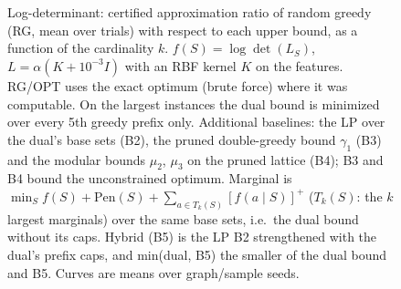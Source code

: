 \begin{figure}[t]
\centering
\setlength{\rgplotwidth}{0.245\textwidth}
\\[1pt]
\hfill
\hfill
\hfill
\\

\caption{Log-determinant: certified approximation ratio of random greedy (RG, mean over trials) with respect to each upper bound, as a function of the cardinality $k$. $f(S)=\log\det(L_S)$, $L=\alpha(K+10^{-3}I)$ with an RBF kernel $K$ on the features. RG/OPT uses the exact optimum (brute force) where it was computable. On the largest instances the dual bound is minimized over every 5th greedy prefix only. Additional baselines: the LP over the dual's base sets (B2), the pruned double-greedy bound $\gamma_1$ (B3) and the modular bounds $\mu_2$, $\mu_3$ on the pruned lattice (B4); B3 and B4 bound the unconstrained optimum. Marginal is $\min_S f(S)+\mathrm{Pen}(S)+\sum_{a\in T_k(S)}[f(a\mid S)]^+$ ($T_k(S)$: the $k$ largest marginals) over the same base sets, i.e.\ the dual bound without its caps. Hybrid (B5) is the LP B2 strengthened with the dual's prefix caps, and min(dual, B5) the smaller of the dual bound and B5. Curves are means over graph/sample seeds.}
\label{fig:rg-log_det-wide-hybrid}
\end{figure}
